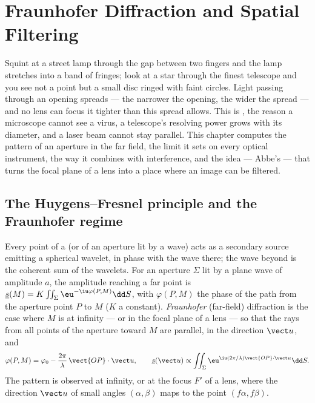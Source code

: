 \chapter{Fraunhofer Diffraction and Spatial Filtering}\label{ch:b2:diffraction}

Squint at a street lamp through the gap between two fingers and the
lamp stretches into a band of fringes; look at a star through the
finest telescope and you see not a point but a small disc ringed with
faint circles. Light passing through an opening spreads --- the
narrower the opening, the wider the spread --- and no lens can focus it
tighter than this spread allows. This is \emph{}, the reason
a microscope cannot see a virus, a telescope's resolving power grows
with its diameter, and a laser beam cannot stay parallel. This chapter
computes the  pattern of an aperture in the far field, the
limit it sets on every optical instrument, the way it combines with
interference, and the idea --- Abbe's --- that turns the focal plane of a
lens into a place where an image can be filtered.

\section{The Huygens--Fresnel principle and the Fraunhofer regime}

\begin{definition}\label{def:b2:diffraction:huygens}
Every point of a  (or of an aperture lit by a wave) acts as a
secondary source emitting a spherical wavelet, in phase with the wave
there; the wave beyond is the coherent sum of the wavelets. For an
aperture $\Sigma$ lit by a plane wave of amplitude $a$, the amplitude
reaching a far point is $\underline s(M) = K\iint_\Sigma\eu^{-\iu\varphi(P, M)}\dd S$, with
$\varphi(P, M)$ the phase of the path from the aperture point $P$ to $M$
($K$ a constant). \emph{Fraunhofer} (far-field) diffraction is the case
where $M$ is at infinity --- or in the focal plane of a lens --- so that
the rays from all points of the aperture toward $M$ are parallel, in
the direction $\vect u$, and
\[
\varphi(P, M) = \varphi_0 - \frac{2\pi}\lambda\,\vect{OP}\cdot\vect u , \qquad
\underline s(\vect u) \propto \iint_\Sigma\eu^{\iu(2\pi/\lambda)\vect{OP}\cdot\vect u}\dd S .
\]
The pattern is observed at infinity, or at the focus $F'$ of a lens,
where the direction $\vect u$ of small angles $(\alpha, \beta)$ maps to the
point $(f\alpha, f\beta)$.
\end{definition}
\admitted

